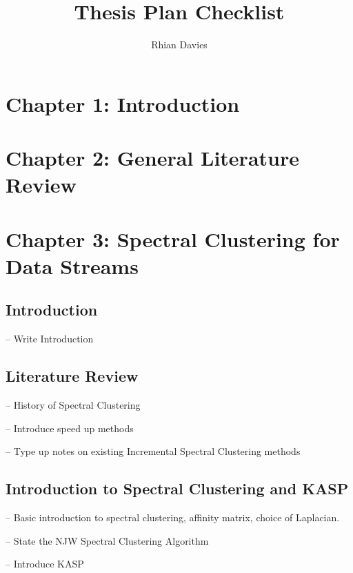 \documentclass[11pt, a4]{article}
\let\oldmarginpar\marginpar
\renewcommand\marginpar[1]{\-\oldmarginpar[\raggedleft #1]
{\raggedright #1}}
\newenvironment{checklist}{
\begin{list}{}{}
  \let\olditem\item
\renewcommand\item{\olditem -- \marginpar{$\Box$}}
\newcommand\checkeditem{\olditem -- \marginpar{$\CheckedBox$}}
}{
\end{list}
}
\begin{document}
\title{Thesis Plan Checklist}
\author{Rhian Davies}

\maketitle

\section{Chapter 1: Introduction}

\section{Chapter 2: General Literature Review}

\section{Chapter 3: Spectral Clustering for Data Streams}

\subsection{Introduction}

\begin{checklist} 
\item Write Introduction   
\end{checklist}

\subsection{Literature Review}
\begin{checklist}
\checkeditem History of Spectral Clustering
\checkeditem Introduce speed up methods 
\checkeditem Type up notes on existing Incremental Spectral Clustering methods
\end{checklist}

\subsection{Introduction to Spectral Clustering and KASP}
\begin{checklist}
\checkeditem Basic introduction to spectral clustering, affinity matrix, choice of Laplacian.
\checkeditem State the NJW Spectral Clustering Algorithm 
\checkeditem Introduce KASP
\end{checklist}
\end{document}
